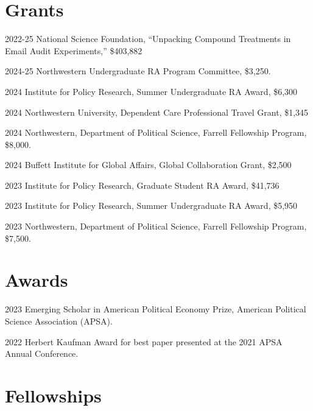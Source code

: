 \documentclass[12pt,letterpaper]{report}
\begin{document}
    \section*{Grants}
	\begin{tablist}
	\item[2022-25]	\tab{}National Science Foundation, ``Unpacking Compound Treatments in Email Audit Experiments,'' \$403,882
    \item[2024-25] \tab{}Northwestern Undergraduate RA Program Committee, \$3,250.
    \item[2024] \tab{}Institute for Policy Research, Summer Undergraduate RA Award, \$6,300 
    \item[2024] \tab{}Northwestern University, Dependent Care Professional Travel Grant, \$1,345
    \item[2024]	\tab{}Northwestern, Department of Political Science, Farrell Fellowship Program, \$8,000.
	\item[2024] \tab{}Buffett Institute for Global Affairs, Global Collaboration Grant, \$2,500
	\item[2023] \tab{}Institute for Policy Research, Graduate Student RA Award, \$41,736 
	\item[2023]	\tab{}Institute for Policy Research, Summer Undergraduate RA Award, \$5,950
	\item[2023]	\tab{}Northwestern, Department of Political Science, Farrell Fellowship Program, \$7,500.
	\end{tablist}	
	
    \section*{Awards}
	
	\begin{tablist}
	\item[2023] \tab{}Emerging Scholar in American Political Economy Prize, American Political Science Association (APSA).
	\item[2022] \tab{}Herbert Kaufman Award for best paper presented at the 2021 APSA Annual Conference.
	\end{tablist}
    
    \section*{Fellowships}
    
\end{document}
